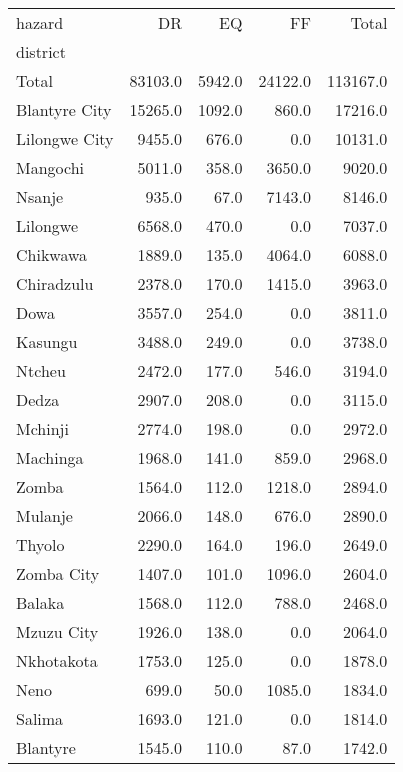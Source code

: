 \begin{tabular}{lrrrr}
\toprule
hazard &       DR &      EQ &       FF &     Total \\
district      &          &         &          &           \\
\midrule
Total         &  83103.0 &  5942.0 &  24122.0 &  113167.0 \\
Blantyre City &  15265.0 &  1092.0 &    860.0 &   17216.0 \\
Lilongwe City &   9455.0 &   676.0 &      0.0 &   10131.0 \\
Mangochi      &   5011.0 &   358.0 &   3650.0 &    9020.0 \\
Nsanje        &    935.0 &    67.0 &   7143.0 &    8146.0 \\
Lilongwe      &   6568.0 &   470.0 &      0.0 &    7037.0 \\
Chikwawa      &   1889.0 &   135.0 &   4064.0 &    6088.0 \\
Chiradzulu    &   2378.0 &   170.0 &   1415.0 &    3963.0 \\
Dowa          &   3557.0 &   254.0 &      0.0 &    3811.0 \\
Kasungu       &   3488.0 &   249.0 &      0.0 &    3738.0 \\
Ntcheu        &   2472.0 &   177.0 &    546.0 &    3194.0 \\
Dedza         &   2907.0 &   208.0 &      0.0 &    3115.0 \\
Mchinji       &   2774.0 &   198.0 &      0.0 &    2972.0 \\
Machinga      &   1968.0 &   141.0 &    859.0 &    2968.0 \\
Zomba         &   1564.0 &   112.0 &   1218.0 &    2894.0 \\
Mulanje       &   2066.0 &   148.0 &    676.0 &    2890.0 \\
Thyolo        &   2290.0 &   164.0 &    196.0 &    2649.0 \\
Zomba City    &   1407.0 &   101.0 &   1096.0 &    2604.0 \\
Balaka        &   1568.0 &   112.0 &    788.0 &    2468.0 \\
Mzuzu City    &   1926.0 &   138.0 &      0.0 &    2064.0 \\
Nkhotakota    &   1753.0 &   125.0 &      0.0 &    1878.0 \\
Neno          &    699.0 &    50.0 &   1085.0 &    1834.0 \\
Salima        &   1693.0 &   121.0 &      0.0 &    1814.0 \\
Blantyre      &   1545.0 &   110.0 &     87.0 &    1742.0 \\

\end{tabular}
